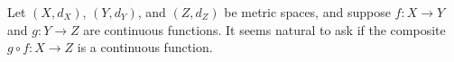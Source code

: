 \begin{comment}

\ActivitySolution

	\ba
	\item  Let $a=(a_1,a_2) \in \R^2$ and let $\epsilon > 0$. Choose any $0 < \delta < \epsilon$. Let $x = (x_1,x_2)$ in $\R^2$ and suppose $d_T(x,a) < \delta$. Then
\[d_T(x,a) = | x_1-a_1\ | + | x_2-a_2 | < \delta = \epsilon.\]
It follows that
\begin{align*}
d_M(f(x), f(a)) &= d_M((x_1+x_2, x_1), (a_1+a_2, a_2)) \\
	&= \max\{ | (x_1+x_2)-(a_1+a_2) |, | x_2-a_2 | \} \\
	&= \max\{ | (x_1-a_1)+(x_2-a_2) |, | x_2-a_2 | \} \\
	&\leq \max\{ | x_1-a_1 | + | x_2-a_2 |, | x_2-a_2 | \} \\
	&= |x_1-a_1|+|x_2-a_2| < \epsilon.
	\end{align*}
Thus, the function $f$ is continuous at every point in $\R^2$ and is therefore a continuous function from $X$ to $Y$. 

	\item  Let $a=(a_1,a_2) \in \R^2$ and let $\epsilon > 0$. Choose any $0 < \delta < \frac{\epsilon}{3}$. Let $x = (x_1,x_2)$ in $\R^2$ and suppose $d_M(x,a) < \delta$. Then
\[d_M(x,a) = \max\{| x_1-a_1\ |, | x_2-a_2 |\} < \delta < \frac{\epsilon}{3}.\]
So $| x_1-a_1 | < \frac{\epsilon}{3}$ and $| x_2-a_2 | < \frac{\epsilon}{3}$. Then
\begin{align*}
d_T(f(x), f(a)) &= d_T((x_1+x_2, x_1), (a_1+a_2, a_2)) \\
	&= | (x_1+x_2)-(a_1+a_2) | + | x_2-a_2 |  \\
	&= | (x_1-a_1)+(x_2-a_2) | + | x_2-a_2 | \} \\
	&\leq \left(| x_1-a_1 | + | x_2-a_2 |\right) + | x_2-a_2 | \\
	&\leq \frac{\epsilon}{3}+\frac{\epsilon}{3} + \frac{\epsilon}{3}  \\
	&= \epsilon.
\end{align*}
Thus, the function $f$ is continuous at every point in $\R^2$ and is therefore a continuous function from $Y$ to $X$. 
	
	\ea

\end{comment}

\label{sec_comp_cont_func}

Let $(X, d_X)$, $(Y,d_Y)$, and $(Z, d_Z)$ be metric spaces, and suppose $f: X \to Y$ and $g: Y \to Z$ are continuous functions. It seems natural to ask if the composite $g \circ f : X \to Z$ is a continuous function.

